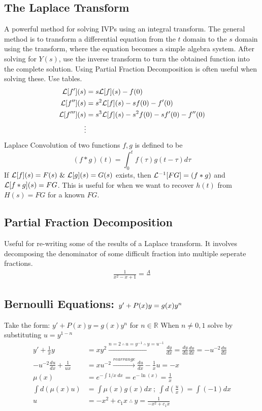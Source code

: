 \subsection{The Laplace Transform}
    A powerful method for solving IVPs using an integral transform. The general method is to transform a differential equation from the $t$ domain to the $s$ domain using the transform, where the equation becomes a simple algebra system. After solving for $Y(s)$, use the inverse transform to turn the obtained function into the complete solution.  Using Partial Fraction Decomposition is often useful when solving these. Use tables.
    \begin{align*}
        \mathcal{L}[f'](s)&=s\mathcal{L}[f](s)-f(0)
        \\
        \mathcal{L}[f''](s)&=s^2\mathcal{L}[f](s)-sf(0)-f'(0)
        \\
        \mathcal{L}[f'''](s)&=s^3\mathcal{L}[f](s)-s^2f(0)-sf'(0)-f''(0)
        \\
        \vdots
    \end{align*}
    Laplace Convolution of two functions $f,g$ is defined to be 
    \[
    (f*g)(t)=\int_0^tf(\tau)g(t-\tau)d\tau
    \]
    If $\mathcal{L}[f](s)=F(s)~\&~\mathcal{L}[g](s)=G(s)$ exists, then $\mathcal{L}^{-1}[FG]=(f*g)$ and $\mathcal{L}[f*g](s)=FG$. This is useful for when we want to recover $h(t)$ from $H(s)=FG$ for a known $FG$.
\subsection{Partial Fraction Decomposition}
Useful for re-writing some of the results of a Laplace transform. It involves decomposing the denominator of some difficult fraction into multiple seperate fractions. 
\begin{align*}
    \frac{1}{x^2-x+1}=\frac{A}{}
\end{align*}
\newpage
\subsection{Bernoulli Equations: \protect\(y'+P(x)y=g(x)y^n\protect\protect\)}
    Take the form: $y'+P(x)y=g(x)y^n$ for $n \in \mathbb{R}$ When $n \neq 0,1$ solve by substituting $u=y^{1-n}$
    \begin{align*}
        y'+\frac{1}{x}y&=xy^2\xrightarrow{n=2\ \therefore\ u=y^{-1}\ \therefore\ y=u^{-1}} \frac{dy}{dx}=\frac{dy}{du}\frac{du}{dx}=-u^{-2}\frac{du}{dx}\\
        -u^{-2}\frac{du}{dx}+\frac{1}{ux}&=xu^{-2}\xrightarrow{rearrange}\frac{du}{dx}-\frac{1}{x}u=-x\\
        \mu(x)&=e^{-\int 1/x\ dx}=e^{-\ln(x)}=\frac{1}{x}\\
        \int d(\mu(x)u)&=\int \mu(x)g(x)dx\ ;\ \int d\left(\frac{u}{x}\right)=\int (-1)dx\\
        u&=-x^2+c_1x\ \therefore\ \boxed{y=\frac{1}{-x^2+c_1x}}
        \end{align*}
